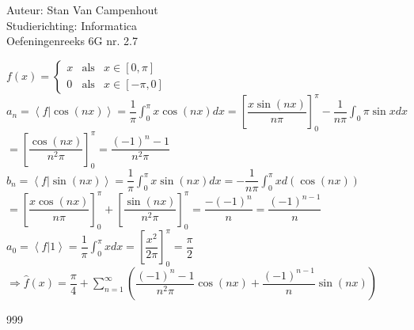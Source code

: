 \documentclass[a4paper]{article}
\begin{document}
  
\noindent \large Auteur: Stan Van Campenhout \\
\noindent \large Studierichting:  Informatica\\
\noindent \large Oefeningenreeks 6G nr. 2.7\\

\medskip

\normalsize

$ f(x) = 
\left\{
\begin{array}{lll}
x & \text{als} & x \in [0,\pi] \\
0 & \text{als} & x \in [-\pi,0]
\end{array}
\right.$\\

$ a_n = \left<f|\cos(nx)\right> = \dfrac{1}{\pi}\displaystyle\int_0^{\pi}x\cos(nx)dx = \left[\dfrac{x\sin(nx)}{n\pi}\right]_0^{\pi} - \dfrac{1}{n\pi}\displaystyle\int_0{\pi}\sin xdx $\\

$ = \left[\dfrac{\cos(nx)}{n^2\pi}\right]_0^{\pi} = \dfrac{(-1)^n - 1}{n^2\pi} $\\

$ b_n = \left<f|\sin(nx)\right> = \dfrac{1}{\pi}\displaystyle\int_0^{\pi}x\sin(nx)dx = -\dfrac{1}{n\pi}\displaystyle\int_0^{\pi}xd(\cos(nx)) $\\

$ = \left[\dfrac{x\cos(nx)}{n\pi}\right]_0^{\pi} + \left[\dfrac{\sin(nx)}{n^2\pi}\right]_0^{\pi} = \dfrac{-(-1)^n}{n} = \dfrac{(-1)^{n-1}}{n} $\\

$ a_0 = \left<f|1\right> = \dfrac{1}{\pi}\displaystyle\int_0^{\pi}xdx = \left[\dfrac{x^2}{2\pi}\right]_0^{\pi} = \dfrac{\pi}{2} $\\

$ \Rightarrow \widehat{f}(x) = \dfrac{\pi}{4} + \displaystyle\sum\limits_{n = 1}^{\infty}\left( \dfrac{(-1)^n - 1}{n^2\pi}\cos(nx) + \dfrac{(-1)^{n-1}}{n}\sin(nx) \right) $\\

\begin{thebibliography}{999}
\end{thebibliography}
\end{document}
